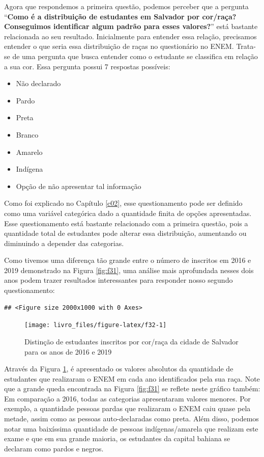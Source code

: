 \documentclass[
  oneside]{book}
\begin{document}
Agora que respondemos a primeira questão, podemos perceber que a pergunta ``\textbf{Como é a distribuição de estudantes em Salvador por cor/raça? Conseguimos identificar algum padrão para esses valores?}'' está bastante relacionada ao seu resultado.
Inicialmente para entender essa relação, precisamos entender o que seria essa distribuição de raças no questionário no ENEM. Trata-se de uma pergunta que busca entender como o estudante se classifica em relação a sua cor. Essa pergunta possui 7 respostas possíveis:

\begin{itemize}
\item
  Não declarado
\item
  Pardo
\item
  Preta
\item
  Branco
\item
  Amarelo
\item
  Indígena
\item
  Opção de não apresentar tal informação
\end{itemize}

Como foi explicado no Capítulo \ref{c02}, esse questionamento pode ser definido como uma variável categórica dado a quantidade finita de opções apresentadas. Esse questionamento está bastante relacionado com a primeira questão, pois a quantidade total de estudantes pode alterar essa distribuição, aumentando ou diminuindo a depender das categorias.

Como tivemos uma diferença tão grande entre o número de inscritos em 2016 e 2019 demonstrado na Figura \ref{fig:f31}, uma análise mais aprofundada nesses dois anos podem trazer resultados interessantes para responder nosso segundo questionamento:

\begin{verbatim}
## <Figure size 2000x1000 with 0 Axes>
\end{verbatim}

\begin{figure}

{\centering \texttt{[image: livro\_files/figure-latex/f32-1]} 

}

\caption{Distinção de estudantes inscritos por cor/raça da cidade de Salvador para os anos de 2016 e 2019}\label{fig:f32}
\end{figure}

Através da Figura \ref{fig:f32}, é apresentado os valores absolutos da quantidade de estudantes que realizaram o ENEM em cada ano identificados pela sua raça. Note que a grande queda encontrada na Figura \ref{fig:f31} se reflete neste gráfico também: Em comparação a 2016, todas as categorias apresentaram valores menores. Por exemplo, a quantidade pessoas pardas que realizaram o ENEM caiu quase pela metade, assim como as pessoas auto-declaradas como preta. Além disso, podemos notar uma baixíssima quantidade de pessoas indígenas/amarela que realizam este exame e que em sua grande maioria, os estudantes da capital bahiana se declaram como pardos e negros.
\end{document}
